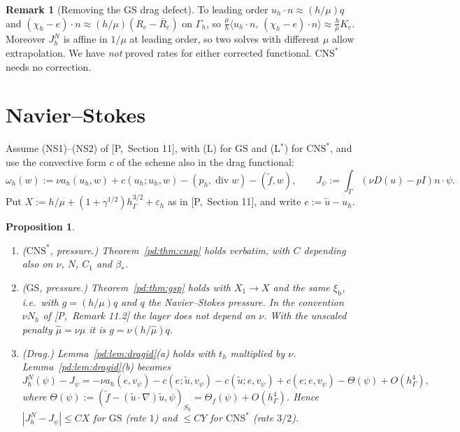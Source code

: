 \documentclass[11pt,reqno]{amsart}
\theoremstyle{plain}
\newtheorem{proposition}[theorem]{Proposition}
\theoremstyle{definition}
\newtheorem{remark}[theorem]{Remark}
\newcommand{\hG}{h_\Gamma}
\newcommand{\Gh}{\Gamma_h}
\newcommand{\ut}{\tilde u}
\newcommand{\ft}{\tilde f}
\newcommand{\ip}[2]{\langle #1,\, #2\rangle}
\newcommand{\GS}{\mathrm{GS}}
\newcommand{\CNS}{\mathrm{CNS}^\ast}
\newcommand{\eps}{\varepsilon_h}
\renewcommand{\div}{\operatorname{div}}
\newcommand{\Pref}[1]{\textup{[P,~#1]}}
\newcommand{\xib}{\xi_{\mathrm b}}
\begin{document}
\begin{remark}[Removing the $\GS$ drag defect]\label{pd:rem:correct}
To leading order $u_h\cdot n\approx(h/\mu)q$ and $(\chi_h-e)\cdot n\approx(h/\mu)(R_e-\bar R_e)$ on $\Gh$, so $\frac\mu h\ip{u_h\cdot n}{(\chi_h-e)\cdot n}\approx\frac h\mu K_e$. Moreover $J^N_h$ is affine in $1/\mu$ at leading order, so two solves with different $\mu$ allow extrapolation. We have \emph{not} proved rates for either corrected functional. $\CNS$ needs no correction.
\end{remark}

\section{Navier--Stokes}\label{pd:sec:ns}

Assume (NS1)--(NS2) of \Pref{Section 11}, with (L) for $\GS$ and (L$^\ast$) for $\CNS$, and use the convective form $c$ of the scheme also in the drag functional:
\[
\omega_h(w):=\nu a_h(u_h,w)+c(u_h;u_h,w)-(p_h,\div w)-(\ft,w),\qquad J_\psi:=\int_\Gamma(\nu D(u)-pI)n\cdot\psi .
\]
Put $X:=h/\mu+(1+\gamma^{1/2})\hG^{3/2}+\eps$ as in \Pref{Section 11}, and write $e:=\ut-u_h$.

\begin{proposition}\label{pd:prop:ns}
\begin{enumerate}[label=(\alph*)]
\item ($\CNS$, pressure.) Theorem~\ref{pd:thm:cnsp} holds verbatim, with $C$ depending also on $\nu$, $N$, $C_1$ and $\beta_\ast$.
\item ($\GS$, pressure.) Theorem~\ref{pd:thm:gsp} holds with $X_1\to X$ and the same $\xib$, i.e.\ with $g=(h/\mu)q$ and $q$ the Navier--Stokes pressure. In the convention $\nu N_h$ of \Pref{Remark 11.2} the layer does not depend on $\nu$. With the unscaled penalty $\hat\mu=\nu\mu$ it is $g=\nu(h/\hat\mu)q$.
\item (Drag.) Lemma~\ref{pd:lem:dragid}(a) holds with $t_h$ multiplied by $\nu$. Lemma~\ref{pd:lem:dragid}(b) becomes
\[
J^N_h(\psi)-J_\psi=-\nu a_h(e,v_\psi)-c(e;\ut,v_\psi)-c(\ut;e,v_\psi)+c(e;e,v_\psi)-\Theta(\psi)+O(\hG^4),
\]
where $\Theta(\psi):=(\ft-(\ut\cdot\nabla)\ut,\psi)_{S_h}=\Theta_f(\psi)+O(\hG^4)$. Hence $|J^N_h-J_\psi|\le CX$ for $\GS$ (rate $1$) and $\le CY$ for $\CNS$ (rate $3/2$).
\end{enumerate}
\end{proposition}
\end{document}
